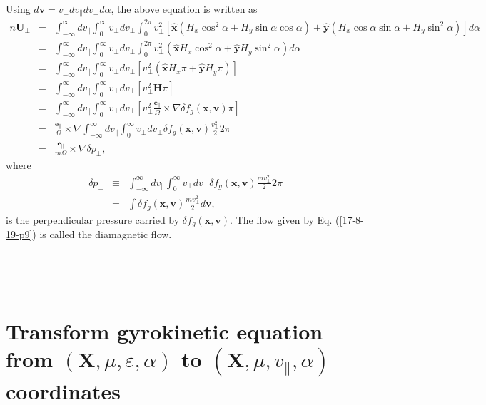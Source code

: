 \documentclass{llncs}
\begin{document}
Using $d\mathbf{v}= v_{\perp} d v_{\parallel} d v_{\perp} d \alpha$, the above
equation is written as
\begin{eqnarray}
  n\mathbf{U}_{\perp} & = & \int_{- \infty}^{\infty} d v_{\parallel}
  \int_0^{\infty} v_{\perp} d v_{\perp} \int_0^{2 \pi} v_{\perp}^2
  [\hat{\mathbf{x}} (H_x \cos^2 \alpha + H_y \sin \alpha \cos \alpha) +
  \hat{\mathbf{y}} (H_x \cos \alpha \sin \alpha + H_y \sin^2 \alpha)] d \alpha
  \nonumber\\
  & = & \int_{- \infty}^{\infty} d v_{\parallel} \int_0^{\infty} v_{\perp} d
  v_{\perp} \int_0^{2 \pi} v_{\perp}^2 (\hat{\mathbf{x}} H_x \cos^2 \alpha +
  \hat{\mathbf{y}} H_y \sin^2 \alpha) d \alpha \nonumber\\
  & = & \int_{- \infty}^{\infty} d v_{\parallel} \int_0^{\infty} v_{\perp} d
  v_{\perp} [v_{\perp}^2 (\hat{\mathbf{x}} H_x \pi + \hat{\mathbf{y}} H_y
  \pi)] \nonumber\\
  & = & \int_{- \infty}^{\infty} d v_{\parallel} \int_0^{\infty} v_{\perp} d
  v_{\perp} [v_{\perp}^2 \mathbf{H} \pi] \nonumber\\
  & = & \int_{- \infty}^{\infty} d v_{\parallel} \int_0^{\infty} v_{\perp} d
  v_{\perp} [v_{\perp}^2 \frac{\mathbf{e}_{\parallel}}{\Omega} \times \nabla
  \delta f_g (\mathbf{x}, \mathbf{v}) \pi] \nonumber\\
  & = & \frac{\mathbf{e}_{\parallel}}{\Omega} \times \nabla \int_{-
  \infty}^{\infty} d v_{\parallel} \int_0^{\infty} v_{\perp} d v_{\perp}
  \delta f_g (\mathbf{x}, \mathbf{v}) \frac{v_{\perp}^2}{2} 2 \pi \nonumber\\
  & = & \frac{\mathbf{e}_{\parallel}}{m \Omega} \times \nabla \delta
  p_{\perp},  \label{17-8-19-p9}
\end{eqnarray}
where
\begin{eqnarray}
  \delta p_{\perp} & \equiv & \int_{- \infty}^{\infty} d v_{\parallel}
  \int_0^{\infty} v_{\perp} d v_{\perp} \delta f_g (\mathbf{x}, \mathbf{v})
  \frac{m v_{\perp}^2}{2} 2 \pi \nonumber\\
  & = & \int \delta f_g (\mathbf{x}, \mathbf{v}) \frac{m v_{\perp}^2}{2}
  d\mathbf{v}, 
\end{eqnarray}
is the perpendicular pressure carried by $\delta f_g (\mathbf{x},
\mathbf{v})$. The flow given by Eq. (\ref{17-8-19-p9}) is called the
diamagnetic flow.

\

\

\section{Transform gyrokinetic equation from $(\mathbf{X}, \mu, \varepsilon,
\alpha)$ to $(\mathbf{X}, \mu, v_{\parallel}, \alpha)$ coordinates}
\end{document}
